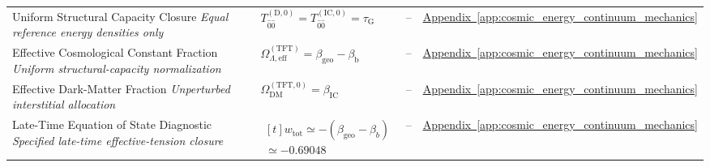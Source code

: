 \begin{longtable}{@{} p{4.5cm} p{6cm} c p{4cm} @{}}
{\raggedright Uniform Structural Capacity Closure \newline \textit{Equal reference energy densities only}\par} & {\raggedright $T_{\hat{0}\hat{0}}^{(\mathrm{D},0)} = T_{\hat{0}\hat{0}}^{(\mathrm{IC},0)} = \tau_{\mathrm{G}}$\par} & -- & {\raggedright \hyperref[app:cosmic_energy_continuum_mechanics]{Appendix~\ref*{app:cosmic_energy_continuum_mechanics}}\par} \\

{\raggedright Effective Cosmological Constant Fraction \newline \textit{Uniform structural-capacity normalization}\par} & {\raggedright $\Omega_{\Lambda,\mathrm{eff}}^{(\mathrm{TFT})} = \beta_{\mathrm{geo}} - \beta_{\mathrm{b}}$\par} & -- & {\raggedright \hyperref[app:cosmic_energy_continuum_mechanics]{Appendix~\ref*{app:cosmic_energy_continuum_mechanics}}\par} \\

{\raggedright Effective Dark-Matter Fraction \newline \textit{Unperturbed interstitial allocation}\par} & {\raggedright $\Omega_{\mathrm{DM}}^{(\mathrm{TFT},0)} = \beta_{\mathrm{IC}}$\par} & -- & {\raggedright \hyperref[app:cosmic_energy_continuum_mechanics]{Appendix~\ref*{app:cosmic_energy_continuum_mechanics}}\par} \\

{\raggedright Late-Time Equation of State Diagnostic \newline \textit{Specified late-time effective-tension closure}\par} & {\raggedright $\begin{gathered}[t]w_{\mathrm{tot}}\simeq-(\beta_{\mathrm{geo}}-\beta_b) \\ \simeq-0.69048\end{gathered}$\par} & -- & {\raggedright \hyperref[app:cosmic_energy_continuum_mechanics]{Appendix~\ref*{app:cosmic_energy_continuum_mechanics}}\par} \\


\end{longtable}
